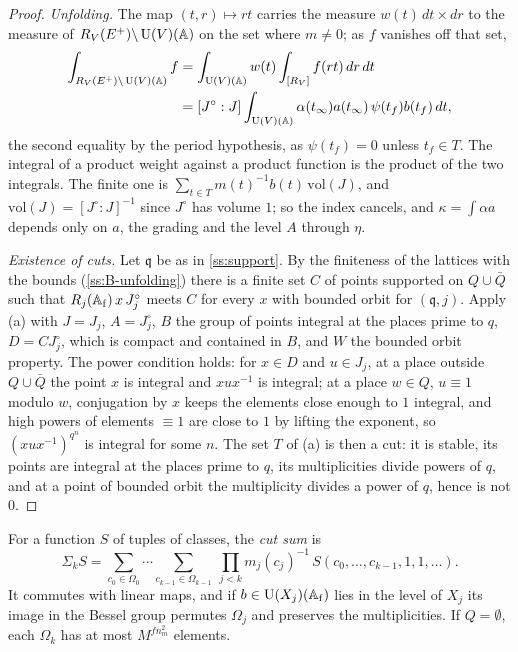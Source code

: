 \begin{proof}
\emph{Unfolding.} The map $(t,r)\mapsto rt$ carries the measure $w(t)\,dt\times dr$ to the measure of $R_V(E^+)\backslash\operatorname{U}(V)(\mathbb{A})$ on the set where $m\ne0$; as $f$ vanishes off that set,
\begin{align*}
  \int_{R_V(E^+)\backslash\operatorname{U}(V)(\mathbb{A})}f&=\int_{\operatorname{U}(V)(\mathbb{A})}w(t)\int_{[R_V]}f(rt)\,dr\,dt\\
  &=[J^\circ:J]\int_{\operatorname{U}(V)(\mathbb{A})}\alpha(t_\infty)a(t_\infty)\,\psi(t_f)b(t_f)\,dt ,
\end{align*}
the second equality by the period hypothesis, as $\psi(t_f)=0$ unless $t_f\in T$. The integral of a product weight against a product function is the product of the two integrals. The finite one is $\sum_{t\in T}m(t)^{-1}b(t)\,\mathrm{vol}(J)$, and $\mathrm{vol}(J)=[J^\circ:J]^{-1}$ since $J^\circ$ has volume $1$; so the index cancels, and
$\kappa=\int\alpha a$ depends only on $a$, the grading and the level $A$ through $\eta$.

\emph{Existence of cuts.} Let $\mathfrak q$ be as in \cref{ss:support}. By the finiteness of the lattices with the bounds (\cref{ss:B-unfolding}) there is a finite set $C$ of points supported on $Q\cup\bar Q$ such that $R_j(\mathbb{A}_{\mathrm f})\,x\,J^\circ_j$ meets $C$ for every $x$ with bounded orbit for $(\mathfrak q,j)$. Apply (a) with $J=J_j$, $A=J^\circ_j$, $B$ the
group of points integral at the places prime to $q$, $D=CJ^\circ_j$, which is compact and contained in $B$, and $W$ the bounded orbit property. The power condition holds: for $x\in D$ and $u\in J_j$, at a place outside $Q\cup\bar Q$ the point $x$ is integral and $xux^{-1}$ is integral; at a place $w\in Q$, $u\equiv1$ modulo $w$, conjugation by $x$
keeps the elements close enough to $1$ integral, and high powers of elements $\equiv1$ are close to $1$ by lifting the exponent, so $(xux^{-1})^{q^n}$ is integral for some $n$. The set $T$ of (a) is then a cut: it is stable, its points are integral at the places prime to $q$, its multiplicities divide powers of $q$, and at a point of bounded
orbit the multiplicity divides a power of $q$, hence is not $0$.
\end{proof}

For a function $S$ of tuples of classes, the \emph{cut sum} is
\[
  \Sigma_kS=\sum_{c_0\in\Omega_0}\cdots\sum_{c_{k-1}\in\Omega_{k-1}}\ \prod_{j<k}m_j(c_j)^{-1}\,S(c_0,\dots,c_{k-1},1,1,\dots).
\]
It commutes with linear maps, and if $b\in\operatorname{U}(X_j)(\mathbb{A}_{\mathrm f})$ lies in the
level of $X_j$ its image in the Bessel group permutes $\Omega_j$ and preserves the multiplicities. If $Q=\emptyset$, each
$\Omega_k$ has at most $M^{fn_m^2}$ elements.

